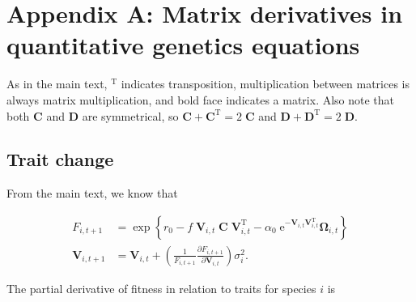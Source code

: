 \section*{Appendix A: Matrix derivatives in quantitative genetics equations}

\renewcommand{\thefigure}{A\arabic{figure}}
\renewcommand{\theequation}{A\arabic{equation}}
\renewcommand{\thetable}{A\arabic{table}}
\setcounter{equation}{0}
\setcounter{figure}{0}
\setcounter{table}{0}


As in the main text, $^{\textrm{T}}$ indicates transposition,
multiplication between matrices is always matrix multiplication, and
bold face indicates a matrix.
Also note that both $\mathbf{C}$ and $\mathbf{D}$ are symmetrical,
so $\mathbf{C} + \mathbf{C}^{\textrm{T}} = 2 \; \mathbf{C}$ and
$\mathbf{D} + \mathbf{D}^{\textrm{T}} = 2 \; \mathbf{D}$.


\subsection*{Trait change}

From the main text, we know that

\begin{equation*}
\begin{split}
    F_{i,t+1} &= \exp \left\{
        r_0 - f \; \mathbf{V}_{i,t} \; \mathbf{C} \; \mathbf{V}_{i,t}^{\textrm{T}} -
        \alpha_0 \;\textrm{e}^{- \mathbf{V}_{i,t} \mathbf{V}_{i,t}^{\textrm{T}} } \mathbf{\Omega}_{i,t}
        \right\} \\
    \mathbf{V}_{i,t+1} &= \mathbf{V}_{i,t} + \left( \frac{1}{F_{i,t+1}}
        \frac{\partial F_{i,t+1}}{\partial \mathbf{V}_{i,t}} \right) \sigma^2_i
    \textrm{.}
\end{split}
\end{equation*}


The partial derivative of fitness in relation to traits for species $i$ is



